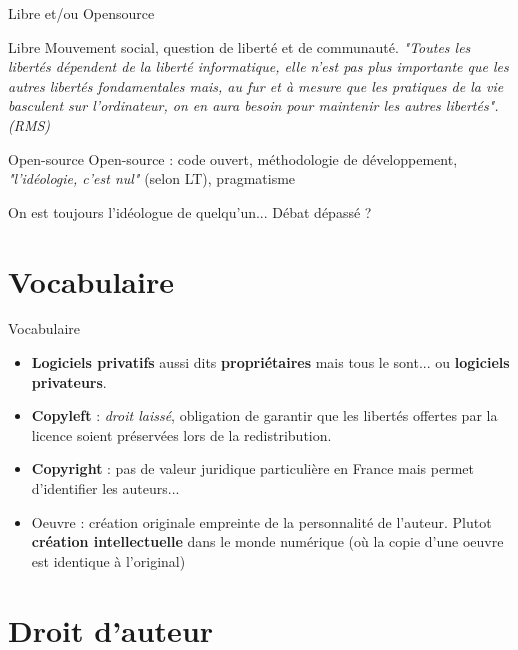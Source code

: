 \documentclass{beamer}
\begin{document}
\begin{frame}{Libre et/ou Opensource}

  \begin{block}{Libre}
    Mouvement social, question de liberté et de communauté. \textit{"Toutes les libertés dépendent de la liberté informatique, elle n’est pas plus importante que les autres libertés fondamentales mais, au fur et à mesure que les pratiques de la vie basculent sur l’ordinateur, on en aura besoin pour maintenir les autres libertés". (RMS)}
  \end{block}

  \begin{block}{Open-source}
    Open-source : code ouvert, méthodologie de développement, \textit{"l'idéologie, c'est nul"} (selon LT), pragmatisme
  \end{block}

On est toujours l'idéologue de quelqu'un... Débat dépassé ?
\end{frame}

\section{Vocabulaire}

\begin{frame}{Vocabulaire}

  \begin{itemize}
  \item \textbf{Logiciels privatifs} aussi dits \textbf{propriétaires} mais tous le sont... ou \textbf{logiciels privateurs}.
  \item \textbf{Copyleft} : \textit{droit laissé}, obligation de garantir que les libertés offertes par la licence soient préservées lors de la redistribution.
  \item \textbf{Copyright} : pas de valeur juridique particulière en France mais permet d'identifier les auteurs...
  \item Oeuvre : création originale empreinte de la personnalité de l'auteur. Plutot \textbf{création intellectuelle} dans le monde numérique (où la copie d'une oeuvre est identique à l'original)
  \end{itemize}
\end{frame}

\section{Droit d'auteur}
\end{document}
